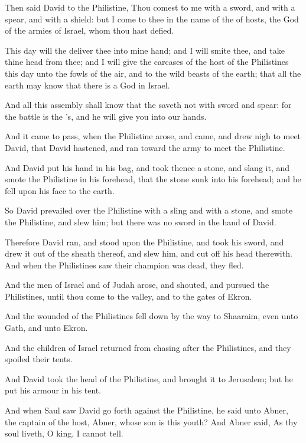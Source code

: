 \verse Then said David to the Philistine, Thou comest to me with a sword, and with a spear, and with a shield: but I come to thee in the name of the \LORD of hosts, the God of the armies of Israel, whom thou hast defied.

\verse This day will the \LORD deliver thee into mine hand; and I will smite thee, and take thine head from thee; and I will give the carcases of the host of the Philistines this day unto the fowls of the air, and to the wild beasts of the earth; that all the earth may know that there is a God in Israel.

\verse And all this assembly shall know that the \LORD saveth not with sword and spear: for the battle is the \LORD's, and he will give you into our hands.

\verse And it came to pass, when the Philistine arose, and came, and drew nigh to meet David, that David hastened, and ran toward the army to meet the Philistine.

\verse And David put his hand in his bag, and took thence a stone, and slang it, and smote the Philistine in his forehead, that the stone sunk into his forehead; and he fell upon his face to the earth.

\verse So David prevailed over the Philistine with a sling and with a stone, and smote the Philistine, and slew him; but there was no sword in the hand of David.

\verse Therefore David ran, and stood upon the Philistine, and took his sword, and drew it out of the sheath thereof, and slew him, and cut off his head therewith. And when the Philistines saw their champion was dead, they fled.

\verse And the men of Israel and of Judah arose, and shouted, and pursued the Philistines, until thou come to the valley, and to the gates of Ekron.

And the wounded of the Philistines fell down by the way to Shaaraim, even unto Gath, and unto Ekron.

\verse And the children of Israel returned from chasing after the Philistines, and they spoiled their tents.

\verse And David took the head of the Philistine, and brought it to Jerusalem; but he put his armour in his tent.

\verse And when Saul saw David go forth against the Philistine, he said unto Abner, the captain of the host, Abner, whose son is this youth?  And Abner said, As thy soul liveth, O king, I cannot tell.

